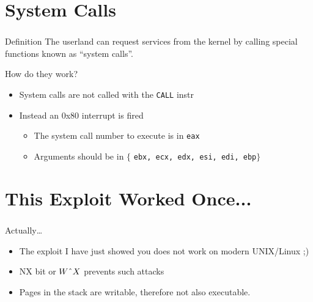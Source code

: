 \documentclass{beamer}
\begin{document}
\section{System Calls}
\begin{frame}[fragile]
  \frametitle{\insertsection}

\begin{block}{Definition}
The userland can request services from the kernel by calling special functions
known as ``system calls''.
\end{block}

\begin{block}{How do they work?}
\begin{itemize}
\item System calls are not called with the \texttt{CALL} instr\\
\vfill
\item Instead an 0x80 interrupt is fired\\
  \begin{itemize}
  \item The system call number to execute is in \texttt{eax}\\
  \item Arguments should be in $\{$ \texttt{ebx, ecx, edx, esi, edi, ebp}$\}$\\
  \end{itemize}
\end{itemize}
\end{block}

\end{frame}

\section{This Exploit Worked Once...}
\begin{frame}[fragile]
  \frametitle{\insertsection}

\begin{block}{Actually\ldots}
\begin{itemize}
  \item The exploit I have just showed you does not work on modern UNIX/Linux ;)\\
  \item NX bit or $W\char`\^X$ prevents such attacks\\
  \item Pages in the stack are writable, therefore not also executable.
  \end{itemize}
\end{block}

\end{frame}
\end{document}
